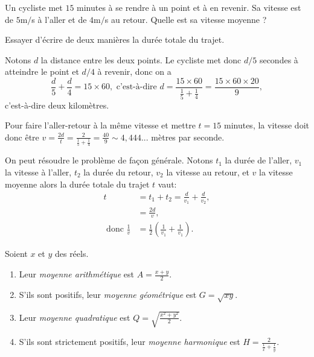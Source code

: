 \begin{exo}
Un cycliste met $15$ minutes à se rendre à un point et à en revenir. Sa vitesse est de $5$m$/$s à l'aller  et de $4$m$/$s au retour. Quelle est sa vitesse moyenne ?

\begin{hint} %
Essayer d'écrire de deux manières la durée totale du trajet.
\end{hint}

\begin{sol}
Notons $d$ la distance entre les deux points. Le cycliste met donc $d/5$ secondes à atteindre le point et $d/4$ à revenir, donc on a 
\[ \frac{d}{5}+\frac{d}{4}=15\times 60,
\text{ c'est-à-dire }
d=\frac{15\times 60}{\frac15+\frac14} = \frac{15\times 60\times 20}{9},
\]
c'est-à-dire deux kilomètres.

Pour faire l'aller-retour à la même vitesse et mettre $t=15$ minutes, la vitesse doit donc être $v=\frac{2d}{t}=\frac{2}{\frac15+\frac14} = \frac{40}{9}\sim 4,444...$ mètres par seconde.

On peut résoudre le problème de façon générale. Notons $t_1$ la durée de l'aller, $v_1$ la vitesse à l'aller, $t_2$ la durée du retour,  $v_2$ la vitesse au retour, et $v$ la vitesse moyenne alors la durée totale du trajet $t$ vaut:
\begin{align*}
t &= t_1+t_2=\frac{d}{v_1}+\frac{d}{v_2}, \\
& = \frac{2d}{v}, \\
\text{ donc } \frac1v & =\frac12 \left( \frac1{v_1}+\frac1{v_1} \right).
\end{align*}
\end{sol}
\end{exo}

\begin{definition}
Soient $x$ et $y$ des réels. 
\begin{enumerate}
\item Leur \emph{moyenne arithmétique} est $A = \frac{x+y}{2}$.
\item S'ils sont positifs, leur \emph{moyenne géométrique} est $G = \sqrt{xy}$.
\item Leur \emph{moyenne quadratique} est $Q=\sqrt{\frac{x^2+y^2}{2}}$.
\item S'ils sont strictement positifs, leur \emph{moyenne harmonique} est $H = \frac{2}{\frac1x+\frac1y}$.
\end{enumerate}
\end{definition}

